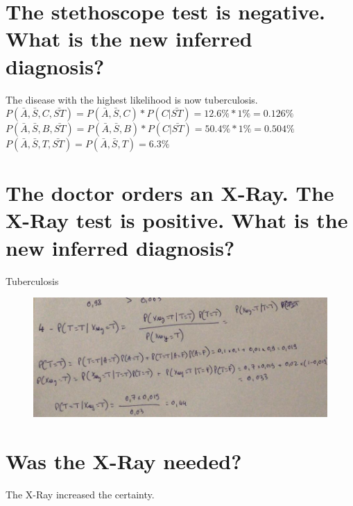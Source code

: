 \documentclass[12pt]{article}
\begin{document}
\section*{The stethoscope test is negative. What is the new inferred diagnosis?}
The disease with the highest likelihood is now tuberculosis.\\
$ P(\bar{A}, \bar{S}, C, \bar{ST}) = P(\bar{A}, \bar{S}, C) * P(C | \bar{ST}) = 12.6\% * 1\% = 0.126\% $\\
$ P(\bar{A}, \bar{S}, B, \bar{ST}) = P(\bar{A}, \bar{S}, B) * P(C | \bar{ST}) = 50.4\% * 1\% = 0.504\% $\\
$P(\bar{A}, \bar{S}, T, \bar{ST}) = P(\bar{A}, \bar{S}, T) = 6.3\%$
\section{The doctor orders an X-Ray. The X-Ray test is positive. What is the new inferred diagnosis?}
Tuberculosis\\
\begin{figure}[hbtp]
\centering
\includegraphics[scale=.45]{lab5_ex4.jpeg}
\end{figure}
\section{Was the X-Ray needed?}
The X-Ray increased the certainty.
\end{document}

